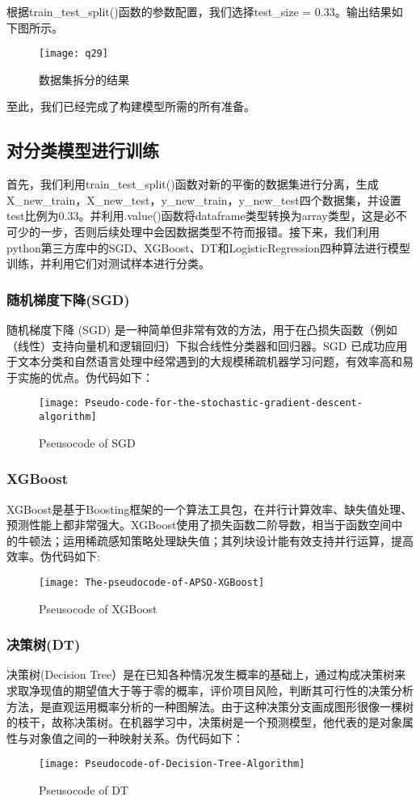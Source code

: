 \documentclass[a4paper,12pt]{article}
\begin{document}
根据train\_test\_split()函数的参数配置，我们选择test\_size = 0.33。输出结果如下图所示。
\begin{figure}[h]%
	\centering%
	\texttt{[image: q29]}
	\caption{数据集拆分的结果}
\end{figure}
至此，我们已经完成了构建模型所需的所有准备。
\subsection{对分类模型进行训练}
首先，我们利用train\_test\_split()函数对新的平衡的数据集进行分离，生成X\_new\_train，X\_new\_test，y\_new\_train，y\_new\_test四个数据集，并设置test比例为0.33。并利用.value()函数将dataframe类型转换为array类型，这是必不可少的一步，否则后续处理中会因数据类型不符而报错。接下来，我们利用python第三方库中的SGD、XGBoost、DT和LogisticRegression四种算法进行模型训练，并利用它们对测试样本进行分类。
\subsubsection{随机梯度下降(SGD)}
随机梯度下降 (SGD) 是一种简单但非常有效的方法，用于在凸损失函数（例如（线性）支持向量机和逻辑回归）下拟合线性分类器和回归器。SGD 已成功应用于文本分类和自然语言处理中经常遇到的大规模稀疏机器学习问题，有效率高和易于实施的优点。伪代码如下：

\begin{figure}[htb]%
	\centering%
	\texttt{[image: Pseudo-code-for-the-stochastic-gradient-descent-algorithm]}
	\caption{Pseusocode of SGD}
\end{figure}

\newpage
\subsubsection{XGBoost}
XGBoost是基于Boosting框架的一个算法工具包，在并行计算效率、缺失值处理、预测性能上都非常强大。XGBoost使用了损失函数二阶导数，相当于函数空间中的牛顿法；运用稀疏感知策略处理缺失值；其列块设计能有效支持并行运算，提高效率。伪代码如下:


\begin{figure}[htb]%
	\centering%
	\texttt{[image: The-pseudocode-of-APSO-XGBoost]}
	\caption{Pseusocode of XGBoost}
\end{figure}
\subsubsection{决策树(DT)}
决策树(Decision Tree）是在已知各种情况发生概率的基础上，通过构成决策树来求取净现值的期望值大于等于零的概率，评价项目风险，判断其可行性的决策分析方法，是直观运用概率分析的一种图解法。由于这种决策分支画成图形很像一棵树的枝干，故称决策树。在机器学习中，决策树是一个预测模型，他代表的是对象属性与对象值之间的一种映射关系。伪代码如下：
\begin{figure}[htbp]
	\centering
	\texttt{[image: Pseudocode-of-Decision-Tree-Algorithm]}
	\caption{Pseusocode of DT}
\end{figure}
\end{document}

